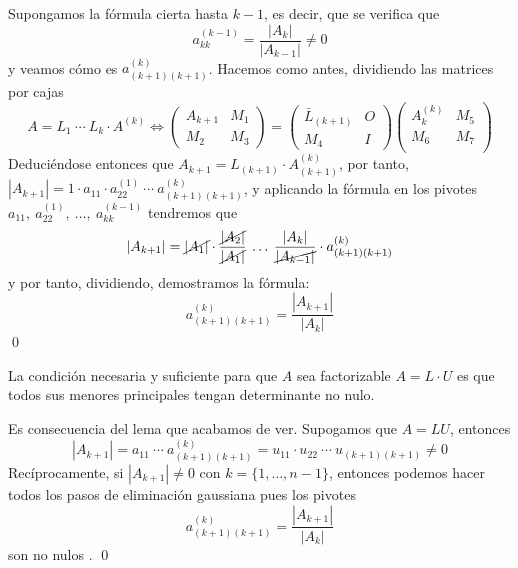 \begin{dem}
        Supongamos la fórmula cierta hasta $k-1$, es decir, que se verifica que 
        $$a_{kk}^{(k-1)}=\dfrac{|A_k|}{|A_{k-1}|}\neq 0$$
        y veamos cómo es $a_{(k+1)(k+1)}^{(k)}$. Hacemos como antes, dividiendo las matrices por cajas
        $$A=L_1 \: \cdots \: L_k \cdot A^{(k)} \iff \left(\begin{array}{c|c}
             A_{k+1} & M_1 \\
             \hline 
             M_2&M_3
        \end{array} \right)=\left(\begin{array}{c|c}
             \bar{L}_{(k+1)} & O \\
             \hline 
             M_4& I
        \end{array} \right)\left(\begin{array}{c|c}
             A^{(k)}_{k} & M_5 \\
             \hline
              M_6& M_7  \\
        \end{array} \right)$$
        Deduciéndose entonces que $A_{k+1}=L_{(k+1)} \cdot A^{(k)}_{(k+1)}$, por tanto, $|A_{k+1}|=1 \cdot a_{11} \cdot a_{22}^{(1)} \: \cdots \: a_{(k+1)(k+1)}^{(k)}$, y aplicando la fórmula en los pivotes $a_{11}, \: a_{22}^{(1)}, \: \ldots, \: a_{kk}^{(k-1)}$ tendremos que 
        $$|A_{k+1}|=\cancel{|A_1|} \cdot \dfrac{\cancel{|A_2|}}{\cancel{|A_1|}} \: \ldots \: \dfrac{|A_k|}{\cancel{|A_{k-1}|}} \cdot a_{(k+1)(k+1)}^{(k)}$$
        y por tanto, dividiendo, demostramos la fórmula:
        $$a_{(k+1)(k+1)}^{(k)}=\dfrac{|A_{k+1}|}{|A_{k}|}$$
    \qed\end{dem}
    \begin{teo}
        La condición necesaria y suficiente para que $A$ sea factorizable $A=L \cdot U$ es que todos sus menores principales tengan determinante no nulo.
    \end{teo}
    \begin{dem}
        Es consecuencia del lema que acabamos de ver. Supogamos que $A=LU$, entonces 
        $$|A_{k+1}|=a_{11} \: \cdots \: a_{(k+1)(k+1)}^{(k)}=u_{11} \cdot u_{22} \: \cdots \: u_{(k+1)(k+1)} \neq 0$$
        Recíprocamente, si $|A_{k+1}| \neq 0 $ con $k=\{1,\ldots,n-1\}$, entonces podemos hacer todos los pasos de eliminación gaussiana pues los pivotes 
        $$a_{(k+1)(k+1)}^{(k)}=\dfrac{|A_{k+1}|}{|A_k|}$$
        son no nulos .
    \qed\end{dem}
